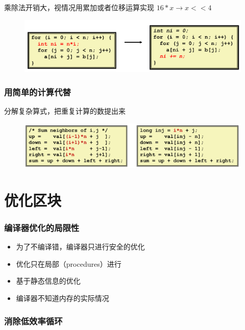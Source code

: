 \documentclass[12pt,AutoFakeBold,aspectratio=43,mathserif]{beamer}
\begin{document}
{\begin{frame}
        乘除法开销大，视情况用累加或者位移运算实现
        \(16*x\rightarrow x<<4\)
        \begin{figure}
            \includegraphics[width=\textwidth]{figures/2.png}
        \end{figure}
    
    \end{frame}

    \begin{frame}
        \frametitle{用简单的计算代替}
    
        分解复杂算式，把重复计算的数提出来
        \begin{figure}
            \includegraphics[width=\textwidth]{figures/3.png}
        \end{figure}
    
    \end{frame}

    \section{优化区块}

    \begin{frame}
        \frametitle{编译器优化的局限性}
    
        \begin{itemize}
            \item 为了不编译错，编译器只进行安全的优化
            \item 优化只在局部（procedures）进行
            \item 基于静态信息的优化
            \item 编译器不知道内存的实际情况
        \end{itemize}
    
    \end{frame}

    \begin{frame}
        \frametitle{消除低效率循环}
    

\end{frame}}
\end{document}

